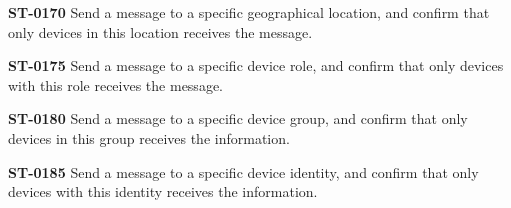 \begin{description}
\item\textbf{ST-0170} Send a message to a specific geographical location, and confirm that only devices in this location receives the message. \\
\item\textbf{ST-0175} Send a message to a specific device role, and confirm that only devices with this role receives the message. \\
\item\textbf{ST-0180} Send a message to a specific device group, and confirm that only devices in this group receives the information.\\
\item\textbf{ST-0185} Send a message to a specific device identity, and confirm that only devices with this identity receives the information. \\

\end{description}

